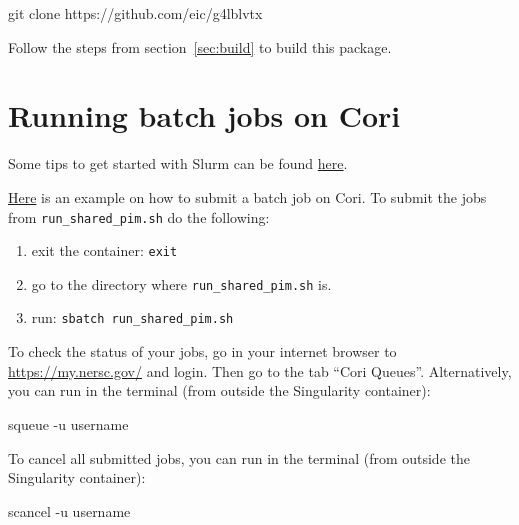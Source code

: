 \documentclass[12pt]{article}
\begin{document}
\begin{tcolorbox}
\begin{verbnobox}[\scriptsize]
git clone https://github.com/eic/g4lblvtx
\end{verbnobox}  
\end{tcolorbox}

Follow the steps from section~\ref{sec:build} to build this package.

\newpage
\section{Running batch jobs on Cori}

Some tips to get started with Slurm can be found \href{https://slurm.schedmd.com/quickstart.html}{here}.

\href{https://github.com/eic/g4lblvtx/tree/master/cori_batch}{Here} is an example on how to submit a batch job on Cori.
To submit the jobs from \verb|run_shared_pim.sh| do the following:

\begin{enumerate}
\item exit the container: \verb|exit|
\item go to the directory where \verb|run_shared_pim.sh| is.
\item run: \verb|sbatch run_shared_pim.sh|
\end{enumerate}

To check the status of your jobs, go in your internet browser to \href{https://my.nersc.gov/}{https://my.nersc.gov/} and login.
Then go to the tab ``Cori Queues''.
Alternatively, you can run in the terminal (from outside the Singularity container):

\begin{tcolorbox}
\begin{verbnobox}[\scriptsize]
squeue -u username
\end{verbnobox}  
\end{tcolorbox}

To cancel all submitted jobs, you can run in the terminal (from outside the Singularity container):

\begin{tcolorbox}
\begin{verbnobox}[\scriptsize]
scancel -u username
\end{verbnobox}  
\end{tcolorbox}

%
%
\end{document}
